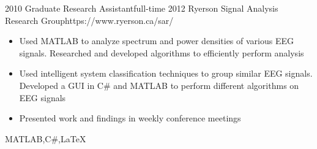 \begin{experiences}
	\emptySeparator
	
	\myExperience
	{2010}       {Graduate Research Assistant}{full-time}
	{2012}      {Ryerson Signal Analysis Research Group}{https://www.ryerson.ca/sar/}
	{
		\begin{itemize}
			\item Used MATLAB to analyze spectrum and power densities of various EEG signals. Researched and developed algorithms to efficiently perform analysis
			\item Used intelligent system classification techniques to group similar EEG signals. Developed a GUI in C\# and MATLAB to perform different algorithms on EEG signals
			\item  Presented work and findings in weekly conference meetings
		\end{itemize}
	}
	{MATLAB,C\#,\LaTeX}
	
\end{experiences}

